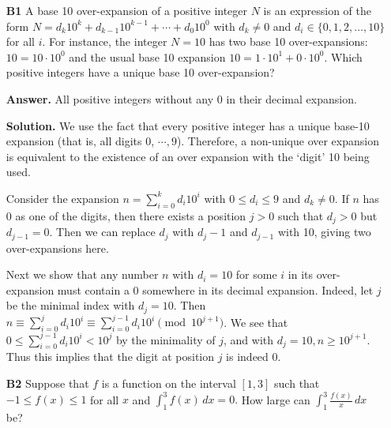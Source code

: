 \documentclass[11pt,a4paper]{article}
\newcommand{\<}{\langle}
\renewcommand{\>}{\rangle}
\newcommand{\dsum}{\displaystyle\sum}
\begin{document}
\begin{enumerate}
	\item[\textbf{B1}] 
	A base 10 over-expansion of a positive integer $N$ is an expression of the form $N=d_k10^k+d_{k-1}10^{k-1}+\cdots+d_0 10^0$ with $d_k\ne 0$ and $d_i\in\{0,1,2,\dots,10\}$ for all $i.$ For instance, the integer $N=10$ has two base 10 over-expansions: $10=10\cdot 10^0$ and the usual base 10 expansion $10=1\cdot 10^1+0\cdot 10^0.$ Which positive integers have a unique base 10 over-expansion?
	
	\textbf{Answer.} All positive integers without any 0 in their decimal expansion. 
	
	\textbf{Solution.} 
	We use the fact that every positive integer has a unique base-10 expansion (that is, all digits 0, $\cdots, 9$). 
	Therefore, a non-unique over expansion is equivalent to the existence of an over expansion with the `digit' 10 being used. 
	
	Consider the expansion $n=\sum_{i=0}^k d_i10^i$ with $0\le d_i\le 9$ and $d_k\neq 0$. 
	If $n$ has 0 as one of the digits, then 
	there exists a position $j>0$ such that $d_j>0$ but $d_{j-1}=0$. 
	Then we can replace $d_j$ with $d_{j}-1$ and $d_{j-1}$ with 10, giving two over-expansions here. 
	
	Next we show that any number $n$ with $d_i=10$ for some $i$ in its over-expansion must contain a 0 somewhere in its decimal expansion. 
	Indeed, let $j$ be the minimal index with $d_j=10$. 
	Then $n\equiv \dsum_{i=0}^{j}d_i10^i \equiv\dsum_{i=0}^{j-1} d_i10^i\pmod{10^{j+1}}$. 
	We see that $0\le \dsum_{i=0}^{j-1} d_i10^i < 10^j$ by the minimality of $j$, 
	and with $d_j=10, n\ge 10^{j+1}$. 
	Thus this implies that the digit at position $j$ is indeed 0. 
	
	\item[\textbf{B2}]Suppose that $f$ is a function on the interval $[1,3]$ such that $-1\le f(x)\le 1$ for all $x$ and $\displaystyle \int_1^3f(x)\,dx=0.$ How large can $\displaystyle\int_1^3\frac{f(x)}x\,dx$ be?
	

\end{enumerate}
\end{document}
